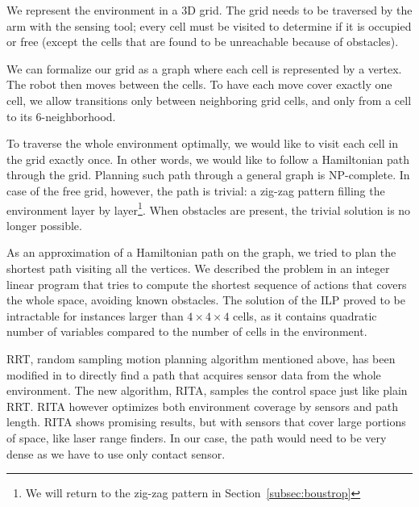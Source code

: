 \documentclass[buriama8_dp.tex]{subfiles}
\begin{document}
We represent the environment in a 3D grid. The grid needs to be traversed by the arm with the sensing tool; every cell must be visited to determine if it is occupied or free (except the cells that are found to be unreachable because of obstacles).

We can formalize our grid as a graph where each cell is represented by a vertex. The robot then moves between the cells. To have each move cover exactly one cell, we allow transitions only between neighboring grid cells, and only from a cell to its 6-neighborhood.

To traverse the whole environment optimally, we would like to visit each cell in the grid exactly once. In other words, we would like to follow a Hamiltonian path through the grid. Planning such path through a general graph is NP-complete. In case of the free grid, however, the path is trivial: a zig-zag pattern filling the environment layer by layer\footnote{We will return to the zig-zag pattern in Section~\ref{subsec:boustrop}}. When obstacles are present, the trivial solution is no longer possible.

As an approximation of a Hamiltonian path on the graph, we tried to plan the shortest path visiting all the vertices. We described the problem in an integer linear program that tries to compute the shortest sequence of actions that covers the whole space, avoiding known obstacles. The solution of the ILP proved to be intractable for instances larger than \(4 \times 4 \times 4\) cells, as it contains quadratic number of variables compared to the number of cells in the environment.

RRT, random sampling motion planning algorithm mentioned above, has been modified in \cite{rita} to directly find a path that acquires sensor data from the whole environment. The new algorithm, RITA, samples the control space just like plain RRT. RITA however optimizes both environment coverage by sensors and path length. RITA shows promising results, but with sensors that cover large portions of space, like laser range finders. In our case, the path would need to be very dense as we have to use only contact sensor.
\end{document}
